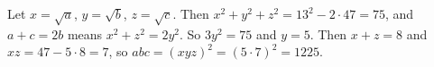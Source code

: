 Let $x=\sqrt a$, $y=\sqrt b$, $z=\sqrt c$. Then $x^2+y^2+z^2=13^2-2\cdot47=75$, and $a+c=2b$ means $x^2+z^2=2y^2$. So $3y^2=75$ and $y=5$. Then $x+z=8$ and $xz=47-5\cdot8=7$, so $abc=(xyz)^2=(5\cdot7)^2=\boxed{1225}$.
